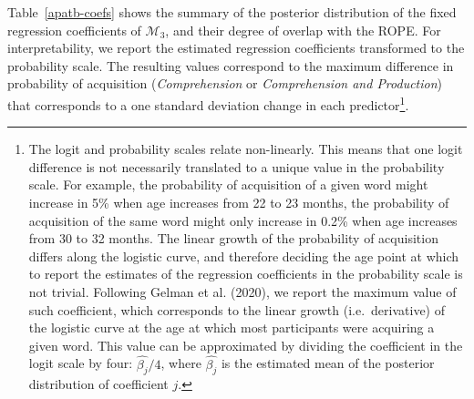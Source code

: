 \documentclass[
  man,
  floatsintext,
  colorlinks=true,linkcolor=blue,citecolor=blue,urlcolor=blue,biblatex]{apa7}
\begin{document}
Table~\ref{apatb-coefs} shows the summary of the posterior distribution
of the fixed regression coefficients of \(\mathcal{M}_{3}\), and their
degree of overlap with the ROPE. For interpretability, we report the
estimated regression coefficients transformed to the probability scale.
The resulting values correspond to the maximum difference in probability
of acquisition (\emph{Comprehension} or \emph{Comprehension and
Production}) that corresponds to a one standard deviation change in each
predictor\footnote{The logit and probability scales relate non-linearly.
  This means that one logit difference is not necessarily translated to
  a unique value in the probability scale. For example, the probability
  of acquisition of a given word might increase in 5\% when age
  increases from 22 to 23 months, the probability of acquisition of the
  same word might only increase in 0.2\% when age increases from 30 to
  32 months. The linear growth of the probability of acquisition differs
  along the logistic curve, and therefore deciding the age point at
  which to report the estimates of the regression coefficients in the
  probability scale is not trivial. Following Gelman et al. (2020), we
  report the maximum value of such coefficient, which corresponds to the
  linear growth (i.e.~derivative) of the logistic curve at the age at
  which most participants were acquiring a given word. This value can be
  approximated by dividing the coefficient in the logit scale by four:
  \(\hat{\beta_j}/4\), where \(\hat{\beta_j}\) is the estimated mean of
  the posterior distribution of coefficient \(j\).}.
\end{document}
